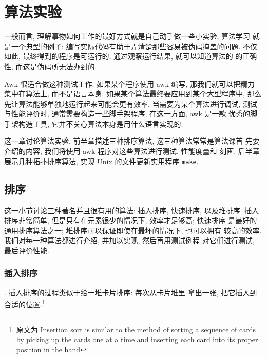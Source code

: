 \chapter{算法实验}
\label{chap:experiments_with_algorithms}

一般而言, 理解事物如何工作的最好方式就是自己动手做一些小实验, 算法学习
就是一个典型的例子: 编写实际代码有助于弄清楚那些容易被伪码掩盖的问题.
不仅如此, 最终得到的程序是可运行的, 通过观察运行结果, 就可以知道算法的
的正确性, 而这是伪码所无法办到的.

Awk 很适合做这种测试工作. 如果某个程序使用 awk 编写, 那我们就可以把精力
集中在算法上, 而不是语言本身. 如果某个算法最终要应用到某个大型程序中,
那么先让算法能够单独地运行起来可能会更有效率. 当需要为某个算法进行调试,
测试与性能评价时, 通常需要构造一些脚手架程序, 在这一方面, awk 是一款
优秀的脚手架构造工具, 它并不关心算法本身是用什么语言实现的.

这一章讨论算法实验. 前半章描述三种排序算法, 这三种算法常常是算法课首
先要介绍的内容, 我们将使用 awk 程序对这些算法进行测试, 性能度量和
刻画. 后半章展示几种拓扑排序算法, 实现 Unix 的文件更新实用程序
\texttt{make}.

\section{排序}
\label{sec:sorting}

这一小节讨论三种著名并且很有用的算法: 插入排序, 快速排序, 以及堆排序.
插入排序非常简单, 但是只有在元素很少的情况下, 效率才足够高; 快速排序
是最好的通用排序算法之一; 堆排序可以保证即使在最坏的情况下, 也可以拥有
较高的效率. 我们对每一种算法都进行介绍, 并加以实现, 然后再用测试例程
对它们进行测试, 最后评价性能.

\subsection{插入排序}
\label{subsec:insertion_sort}
. 插入排序的过程类似于给一堆卡片排序: 每次从卡片堆里
拿出一张, 把它插入到合适的位置.\footnote{原文为 Insertion sort is similar
    to the method of sorting a sequence of cards by picking up the cards
    one at a time and inserting each card into its proper position in the
hand}

